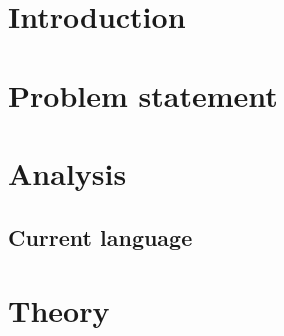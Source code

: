 


\frontmatter %
\newcommand{\ind}[1]{}

\ind{FormaliaForside}
\cleardoublepage %

\ind{FormaliaTitelblad}
\cleardoublepage
\ind{FormaliaProlog.tex}
\ind{FormaliaUnderskriftsside.tex}
\cleardoublepage



\setlength\parskip{0ex} %
\tableofcontents* %
\setlength{\parskip}{3mm} %



\label{marker}
\mainmatter

\pagestyle{custom}

\chapter{Introduction}
\ind{FormaliaIndledning}

\renewcommand{\ind}[1]{}
\chapter{Problem statement}
\chapter{Analysis}
	\ind{ourEnvironment}
	\section{Current language}
	\ind{Hardware}
	\ind{problemstatement}

\renewcommand{\ind}[1]{}
\chapter{Theory}
	\ind{OverviewCompiler}
